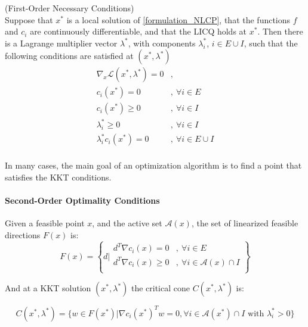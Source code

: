 \begin{theorem}(First-Order Necessary Conditions)\\
  \label{KKT_conditions}
  Suppose that $x^*$ is a local solution of \ref{formulation_NLCP}, that the functions $f$ and $c_i$ are continuously differentiable, and that the LICQ holds at $x^*$.
  Then there is a Lagrange multiplier vector $\lambda^*$, with components $\lambda_i^*$, $i\in E\cup I$, such that the following conditions are satisfied at $(x^*,\lambda^*)$
  \begin{equation}
  \begin{array}{ll}
    \nabla_x\mathcal{L}(x^*,\lambda^*) = 0 &, \\
    c_i(x^*) = 0 &,\ \forall i\in E\\
    c_i(x^*) \geq 0 &,\ \forall i\in I\\
    \lambda_i^* \geq 0 &,\ \forall i\in I\\
    \lambda_i^* c_i(x^*)=0 &,\ \forall i \in E\cup I\\
  \end{array}
  \end{equation}
\end{theorem}

In many cases, the main goal of an optimization algorithm is to find a point that satisfies the KKT conditions.

\paragraph{Second-Order Optimality Conditions}

\begin{definition}
  Given a feasible point $x$, and the active set $\mathcal{A}(x)$, the  set of linearized feasible directions $F(x)$ is:
  \begin{equation}
    F(x)=\left\{d|
        \begin{array}{ll}
          d^T\nabla c_i(x) = 0&,\ \forall i\in E \\
          d^T\nabla c_i(x) \geq 0&,\ \forall i\in \mathcal{A}(x)\cap I \\
        \end{array}
    \right\}
  \end{equation}
\end{definition}

And at a KKT solution $(x^*,\lambda^*)$ the critical cone $C(x^*, \lambda^*)$ is:

\begin{equation}
  C(x^*,\lambda^*) = \{w\in F(x^*)|\nabla c_i(x^*)^Tw=0, \forall i\in\mathcal{A}(x^*)\cap I \text{ with } \lambda_i^*>0\}
\end{equation}

